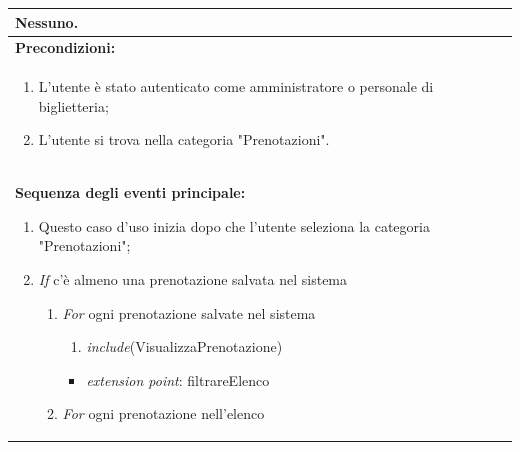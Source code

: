 \documentclass{article}
\begin{document}
\begin{table}[t]
\begin{tabular}{|p{\linewidth}|}
                        Nessuno. \\
                        \hline
                        \cellcolor{gray!20}
                        \textbf{Precondizioni:} \\
                        \cellcolor{gray!20}
                        \begin{minipage}{\linewidth}
                            \begin{enumerate}[noitemsep]
                                \item L'utente è stato autenticato come amministratore o personale di biglietteria;
                                \item L'utente si trova nella categoria "Prenotazioni". %
                            \end{enumerate}
                        \end{minipage}
                        \vspace{0pt} \\
                        \hline
                        \textbf{Sequenza degli eventi principale:}
                        \begin{enumerate}
                            \item Questo caso d'uso inizia dopo che l'utente seleziona la categoria "Prenotazioni";
                            \item \textit{If} c'è almeno una prenotazione salvata nel sistema
                            \begin{enumerate}
                                \item \textit{For} ogni prenotazione salvate nel sistema
                                \begin{enumerate}
                                    \item \textit{include}(VisualizzaPrenotazione)
                                \end{enumerate}
                                \begin{itemize}[noitemsep]
                                    \item[] \hspace*{-\tabcolsep*3} \textit{extension point}: filtrareElenco
                                \end{itemize}
                                \item \textit{For} ogni prenotazione nell'elenco
                                \begin{itemize}[noitemsep]

\end{itemize}
\end{enumerate}
\end{enumerate}
\end{tabular}
\end{table}
\end{document}
